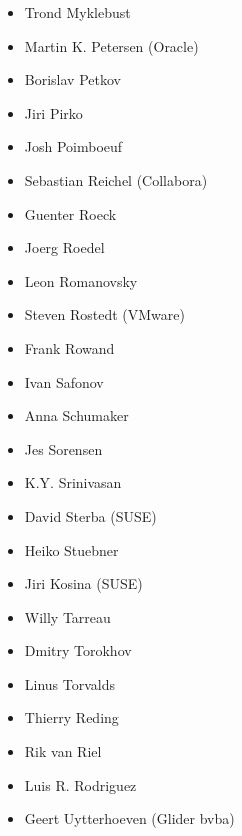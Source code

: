 \documentclass[a4paper,8pt,english]{sphinxmanual}
\begin{document}
\begin{itemize}
\item {} 
Trond Myklebust

\item {} 
Martin K. Petersen (Oracle)

\item {} 
Borislav Petkov

\item {} 
Jiri Pirko

\item {} 
Josh Poimboeuf

\item {} 
Sebastian Reichel (Collabora)

\item {} 
Guenter Roeck

\item {} 
Joerg Roedel

\item {} 
Leon Romanovsky

\item {} 
Steven Rostedt (VMware)

\item {} 
Frank Rowand

\item {} 
Ivan Safonov

\item {} 
Anna Schumaker

\item {} 
Jes Sorensen

\item {} 
K.Y. Srinivasan

\item {} 
David Sterba (SUSE)

\item {} 
Heiko Stuebner

\item {} 
Jiri Kosina (SUSE)

\item {} 
Willy Tarreau

\item {} 
Dmitry Torokhov

\item {} 
Linus Torvalds

\item {} 
Thierry Reding

\item {} 
Rik van Riel

\item {} 
Luis R. Rodriguez

\item {} 
Geert Uytterhoeven (Glider bvba)


\end{itemize}
\end{document}
